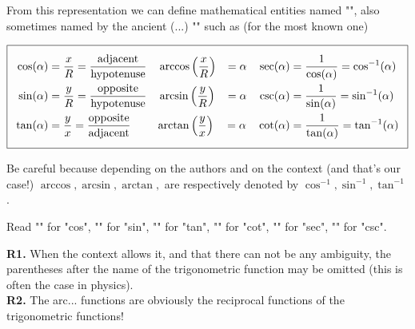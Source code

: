 From this representation we can define mathematical entities named "", also sometimes named by the ancient (...) "\label{cyclometrics functions}" such as (for the most known one)\label{definition trigonometric functions}

\begin{equation}
  \addtolength{\fboxsep}{5pt}
   \boxed{
   \begin{gathered}
   		\begin{aligned}
		\cos(\alpha)&=\dfrac{x}{R}=\dfrac{\text{adjacent}}{\text{hypotenuse}} \quad \arccos \left( \dfrac{x}{R}\right) &=\alpha \quad \sec(\alpha)&=\dfrac{1}{\cos(\alpha)}=\cos^{-1}(\alpha)\\
		\sin(\alpha)&=\dfrac{y}{R}=\dfrac{\text{opposite}}{\text{hypotenuse}} \quad \arcsin \left( \dfrac{y}{R}\right) &=\alpha \quad \csc(\alpha)&=\dfrac{1}{\sin(\alpha)}=\sin^{-1}(\alpha)\\
		\tan(\alpha)&=\dfrac{y}{x}=\dfrac{\text{opposite}}{\text{adjacent}} \qquad \; \arctan \left( \dfrac{y}{x}\right) &=\alpha \quad \cot(\alpha)&=\dfrac{1}{\tan(\alpha)}=\tan^{-1}(\alpha)
   		\end{aligned}
   \end{gathered}
   }
\end{equation}

Be careful because depending on the authors and on the context (and that's our case!) $\arccos, \arcsin, \arctan, $ are respectively denoted by $\cos^{-1}, \sin^{-1}, \tan^{-1}$.

Read "" for "cos", "" for "sin", "" for "tan", "" for "cot", "" for "sec", "" for "csc".

	\begin{tcolorbox}[title=Remarks,colframe=black,arc=10pt]
	\textbf{R1.} When the context allows it, and that there can not be any ambiguity, the parentheses after the name of the trigonometric function may be omitted (this is often the case in physics).\\
	
	\textbf{R2.} The arc... functions are obviously the reciprocal functions of the trigonometric functions!
	\end{tcolorbox}

